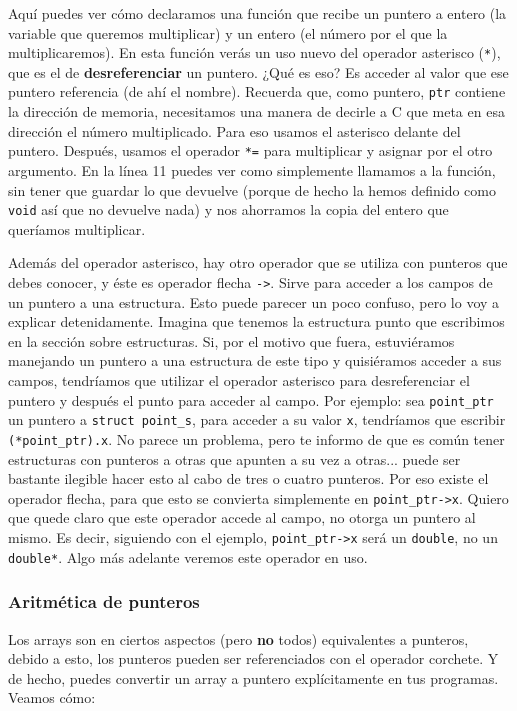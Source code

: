 \documentclass[a4paper]{article}
\begin{document}
Aquí puedes ver cómo declaramos una función que recibe un puntero a entero (la
variable que queremos multiplicar) y un entero (el número por el que la
multiplicaremos). En esta función verás un uso nuevo del operador asterisco
(\verb!*!), que es el de \textbf{desreferenciar} un puntero. ¿Qué es eso?
Es acceder al valor que ese puntero referencia (de ahí el nombre). Recuerda
que, como puntero, \verb!ptr! contiene la dirección de memoria, necesitamos una
manera de decirle a C que meta en esa dirección el número multiplicado. Para eso
usamos el asterisco delante del puntero. Después, usamos el operador \verb!*=!
para multiplicar y asignar por el otro argumento.
En la línea 11 puedes ver como simplemente llamamos a la función, sin tener
que guardar lo que devuelve (porque de hecho la hemos definido como \verb!void!
así que no devuelve nada) y nos ahorramos la copia del entero que queríamos
multiplicar.

Además del operador asterisco, hay otro operador que se utiliza con punteros
que debes conocer, y éste es operador flecha \verb|->|. Sirve para acceder a los
campos de un puntero a una estructura. Esto puede parecer un poco confuso, pero
lo voy a explicar detenidamente. Imagina que tenemos la estructura punto que
escribimos en la sección sobre estructuras. Si, por el motivo que fuera,
estuviéramos
manejando un puntero a una estructura de este tipo y quisiéramos acceder a sus
campos,
tendríamos que utilizar el operador asterisco para desreferenciar el puntero
y después el punto para acceder al campo. Por ejemplo: sea \verb!point_ptr! un
puntero a \verb!struct point_s!, para acceder a su valor \verb!x!, tendríamos
que escribir \verb!(*point_ptr).x!. No parece un problema, pero te informo de
que es común tener estructuras con punteros a otras que apunten a su vez a
otras... puede ser bastante ilegible hacer esto al cabo de tres o cuatro
punteros. Por eso existe el operador flecha, para que esto se convierta
simplemente en \verb|point_ptr->x|. Quiero que quede claro que este operador
accede al campo, no otorga un puntero al mismo. Es decir, siguiendo con el
ejemplo, \verb!point_ptr->x! será un \verb!double!, no un \verb!double*!.
Algo más adelante veremos este operador en uso.

\subsubsection{Aritmética de punteros}
Los arrays son en ciertos aspectos (pero \textbf{no} todos) equivalentes a
punteros, debido a esto, los punteros pueden ser referenciados con el operador
corchete. Y de hecho, puedes convertir un array a puntero explícitamente en
tus programas. Veamos cómo:
\end{document}
